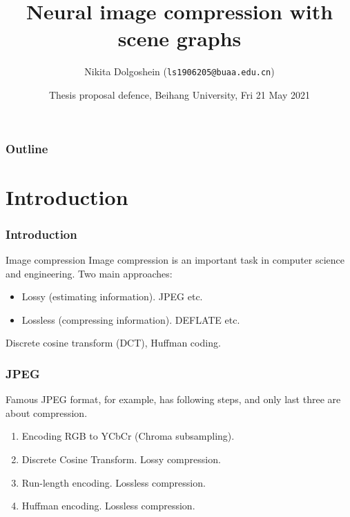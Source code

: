 \documentclass[10pt]{beamer}
\title{Neural image compression with scene graphs}
\author{Nikita Dolgoshein (\texttt{ls1906205@buaa.edu.cn})}
\date{Thesis proposal defence, Beihang University, Fri  21 May 2021}
\begin{document}
\begin{frame}[plain]
    \maketitle
\end{frame}

\begin{frame}
    \frametitle{Outline}
    \tableofcontents
\end{frame}

\section{Introduction}

\begin{frame}
    \frametitle{Introduction}
    \begin{block}{Image compression}
        Image compression is an important task in computer science and engineering.
        Two main approaches:
        \begin{itemize}
            \item Lossy (estimating information). JPEG etc.
            \item Lossless (compressing information). DEFLATE etc.
        \end{itemize}
        Discrete cosine transform (DCT), Huffman coding.
    \end{block}
\end{frame}

\begin{frame}
    \frametitle{JPEG}
    Famous JPEG format, for example, has following steps, and only last three are about compression.

    \begin{enumerate}
        \item Encoding RGB to YCbCr (Chroma subsampling).
        \item Discrete Cosine Transform. Lossy compression.
        \item Run-length encoding. Lossless compression.
        \item Huffman encoding. Lossless compression.
    \end{enumerate}
\end{frame}
\end{document}
